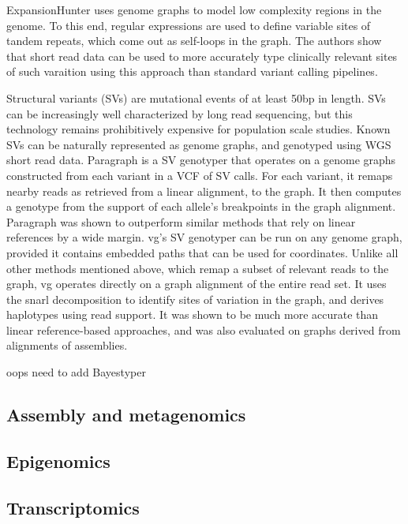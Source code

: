 ExpansionHunter \cite{dolzhenko2019expansionhunter} uses genome graphs to model low complexity regions in the genome.
To this end, regular expressions are used to define variable sites of tandem repeats, which come out as self-loops in the graph.
The authors show that short read data can be used to more accurately type clinically relevant sites of such varaition using this approach than standard variant calling pipelines.

Structural variants (SVs) are mutational events of at least 50bp in length.
SVs can be increasingly well characterized by long read sequencing, but this technology remains prohibitively expensive for population scale studies.
Known SVs can be naturally represented as genome graphs, and genotyped using WGS short read data.
Paragraph \cite{chen2019paragraph} is a SV genotyper that operates on a genome graphs constructed from each variant in a VCF of SV calls.
For each variant, it remaps nearby reads as retrieved from a linear alignment, to the graph.
It then computes a genotype from the support of each allele's breakpoints in the graph alignment.
Paragraph was shown to outperform similar methods that rely on linear references by a wide margin.
vg's SV \cite{hickey2019genotyping} genotyper can be run on any genome graph, provided it contains embedded paths that can be used for coordinates.
Unlike all other methods mentioned above, which remap a subset of relevant reads to the graph, vg operates directly on a graph alignment of the entire read set.
It uses the snarl decomposition \cite{paten2018superbubbles} to identify sites of variation in the graph, and derives haplotypes using read support.
It was shown to be much more accurate than linear reference-based approaches, and was also evaluated on graphs derived from alignments of assemblies.


oops need to add Bayestyper \cite{sibbesen2018accurate}


\subsection{Assembly and metagenomics}

\subsection{Epigenomics}

\subsection{Transcriptomics}

